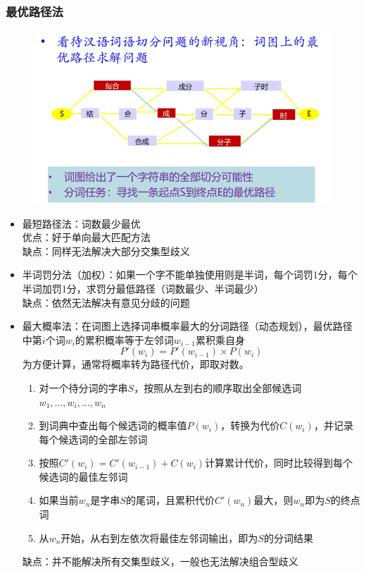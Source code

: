 \subsubsection{最优路径法}
\begin{figure}[H]
\centering
\includegraphics[width=0.6\linewidth]{fig/best_path.png}
\end{figure}
\begin{itemize}
\item 最短路径法：词数最少最优\\
优点：好于单向最大匹配方法\\
缺点：同样无法解决大部分交集型歧义
\item 半词罚分法（加权）：如果一个字不能单独使用则是半词，每个词罚1分，每个半词加罚1分，求罚分最低路径（词数最少、半词最少）\\
缺点：依然无法解决有意见分歧的问题
\item 最大概率法：在词图上选择词串概率最大的分词路径（动态规划），最优路径中第$i$个词$w_i$的累积概率等于左邻词$w_{i-1}$累积乘自身
\[P'(w_i)=P'(w_{i-1})\times P(w_i)\]
为方便计算，通常将概率转为路径代价，即取对数。
\begin{enumerate}
	\item 对一个待分词的字串$S$，按照从左到右的顺序取出全部候选词$w_1,\ldots,w_i,\ldots,w_n$
	\item 到词典中查出每个候选词的概率值$P(w_i)$，转换为代价$C(w_i)$，并记录每个候选词的全部左邻词
	\item 按照$C'(w_i)=C'(w_{i-1})+C(w_i)$计算累计代价，同时比较得到每个候选词的最佳左邻词
	\item 如果当前$w_n$是字串$S$的尾词，且累积代价$C'(w_n)$最大，则$w_n$即为$S$的终点词
	\item 从$w_n$开始，从右到左依次将最佳左邻词输出，即为$S$的分词结果
\end{enumerate}
缺点：并不能解决所有交集型歧义，一般也无法解决组合型歧义
\end{itemize}

